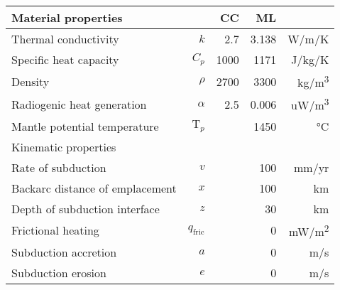 \begin{tabularx}{\textwidth}{X r r r r}
\toprule
  Material properties & & CC & ML & \\
\midrule
  Thermal conductivity & $k$ & 2.7 & 3.138 & \si{W/m/K} \\
  Specific heat capacity & $C_p$ & 1000 & 1171 & \si{J/kg/K} \\
  Density & $\rho$ & 2700 & 3300 & \si{kg/m^3} \\
  Radiogenic heat generation & $\alpha$ & 2.5 & 0.006 & \si{uW/m^3} \\
  Mantle potential temperature & $\textrm{T}_p$ & \multicolumn{2}{r}{1450} & \si{\celsius} \\
\midrule
  \multicolumn{5}{l}{Kinematic properties \citep[][subduction model]{Royden1993a}} \\
\midrule
  Rate of subduction & $v$ & \multicolumn{2}{r}{100} & \si{mm/yr} \\
  Backarc distance of emplacement & $x$ & \multicolumn{2}{r}{100} & \si{km} \\
  Depth of subduction interface & $z$ & \multicolumn{2}{r}{30} & \si{km} \\
  Frictional heating & $q_\textrm{fric}$ & \multicolumn{2}{r}{0} & \si{mW/m^2} \\
  Subduction accretion & $a$ &  \multicolumn{2}{r}{0} & \si{m/s} \\
  Subduction erosion & $e$ & \multicolumn{2}{r}{0} & \si{m/s} \\
\bottomrule
\end{tabularx}
